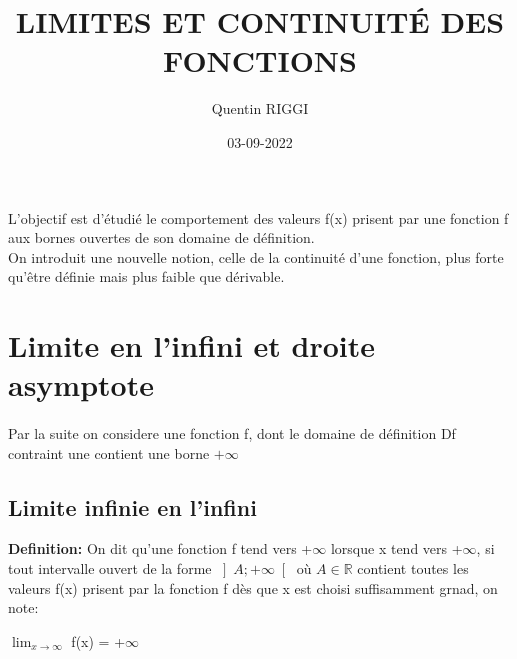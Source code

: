 \documentclass{article}
\title{\color{darkred}\Huge LIMITES ET CONTINUITÉ DES FONCTIONS}
\date{03-09-2022}
\author{Quentin RIGGI}
\renewcommand\large{\color{text}}
\begin{document}
	\maketitle
	\large L'objectif est d'étudié le comportement des valeurs f(x) prisent par une fonction f aux bornes ouvertes de son domaine de définition.\\
	\large On introduit une nouvelle notion, celle de la continuité d'une fonction, plus forte qu'être définie mais plus faible que dérivable.
	
	\section{Limite en l'infini et droite asymptote}
	\paragraph{} \large Par la suite on considere une fonction f, dont le domaine de définition Df contraint une contient une borne $+ \infty$ 

	\subsection{Limite infinie en l'infini}
	\textbf{\color{crimson}Definition:} On dit qu'une fonction f tend vers +$\infty$ lorsque x tend vers +$\infty$, si tout intervalle ouvert de la forme
	$\left]A; +\infty \right[$ où $A\in\mathbb{R}$ contient toutes les valeurs f(x) prisent par la fonction f dès que x est choisi suffisamment grnad, on note:\\
	\begin{center}
		\Large $\lim_{x \to \infty}$ f(x) = +$\infty$
	\end{center}
	
\end{document}
